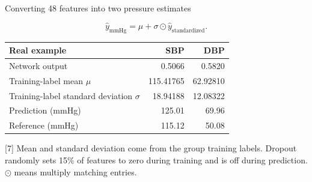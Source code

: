 \documentclass[aspectratio=169,11pt]{beamer}
\newcommand{\source}[1]{\vfill\par{\fontsize{7}{8}\selectfont\color{Muted}#1}}
\newcommand{\smalltable}{\fontsize{9}{11}\selectfont\renewcommand{\arraystretch}{1.18}}
\begin{document}
\begin{frame}{Converting 48 features into two pressure estimates}
\begin{center}\end{center}
\[\widehat y_{\mathrm{mmHg}}=\mu+\sigma\odot\widehat y_{\mathrm{standardized}}.\]
\smalltable\begin{tabular}{lrr}\toprule
Real example & SBP & DBP\\\midrule
Network output & 0.5066 & 0.5820\\
Training-label mean $\mu$ & 115.41765 & 62.92810\\
Training-label standard deviation $\sigma$ & 18.94188 & 12.08322\\
Prediction (mmHg) & 125.01 & 69.96\\
Reference (mmHg) & 115.12 & 50.08\\\bottomrule\end{tabular}
\source{[7] Mean and standard deviation come from the group training labels. Dropout randomly sets 15\% of features to zero during training and is off during prediction. $\odot$ means multiply matching entries.}
\end{frame}
\end{document}
